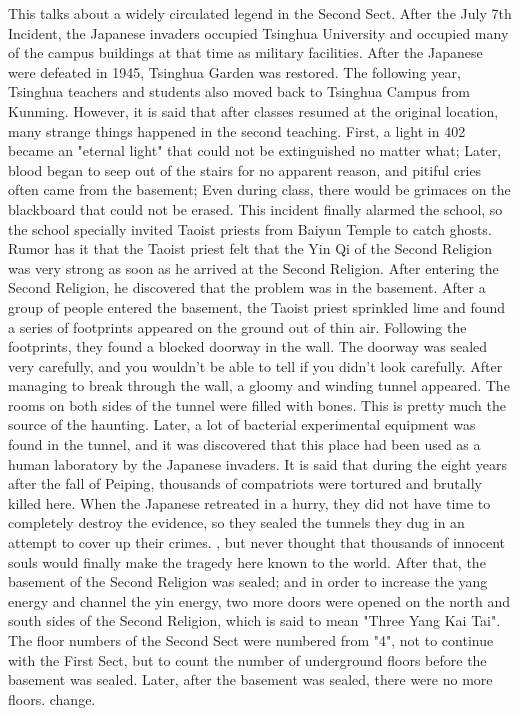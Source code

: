 This talks about a widely circulated legend in the Second Sect.  After the July
7th Incident, the Japanese invaders occupied Tsinghua University and occupied
many of the campus buildings at that time as military facilities.  After the
Japanese were defeated in 1945, Tsinghua Garden was restored. The following
year, Tsinghua teachers and students also moved back to Tsinghua Campus from
Kunming.  However, it is said that after classes resumed at the original
location, many strange things happened in the second teaching.  First, a light
in 402 became an "eternal light" that could not be extinguished no matter what;
Later, blood began to seep out of the stairs for no apparent reason, and
pitiful cries often came from the basement; Even during class, there would be
grimaces on the blackboard that could not be erased.  This incident finally
alarmed the school, so the school specially invited Taoist priests from Baiyun
Temple to catch ghosts.  Rumor has it that the Taoist priest felt that the Yin
Qi of the Second Religion was very strong as soon as he arrived at the Second
Religion. After entering the Second Religion, he discovered that the problem
was in the basement.  After a group of people entered the basement, the Taoist
priest sprinkled lime and found a series of footprints appeared on the ground
out of thin air. Following the footprints, they found a blocked doorway in the
wall. The doorway was sealed very carefully, and you wouldn't be able to tell
if you didn't look carefully.  After managing to break through the wall, a
gloomy and winding tunnel appeared. The rooms on both sides of the tunnel were
filled with bones. This is pretty much the source of the haunting.  Later, a
lot of bacterial experimental equipment was found in the tunnel, and it was
discovered that this place had been used as a human laboratory by the Japanese
invaders.  It is said that during the eight years after the fall of Peiping,
thousands of compatriots were tortured and brutally killed here. When the
Japanese retreated in a hurry, they did not have time to completely destroy the
evidence, so they sealed the tunnels they dug in an attempt to cover up their
crimes. , but never thought that thousands of innocent souls would finally make
the tragedy here known to the world.  After that, the basement of the Second
Religion was sealed; and in order to increase the yang energy and channel the
yin energy, two more doors were opened on the north and south sides of the
Second Religion, which is said to mean "Three Yang Kai Tai".  The floor numbers
of the Second Sect were numbered from "4", not to continue with the First Sect,
but to count the number of underground floors before the basement was sealed.
Later, after the basement was sealed, there were no more floors. change.

